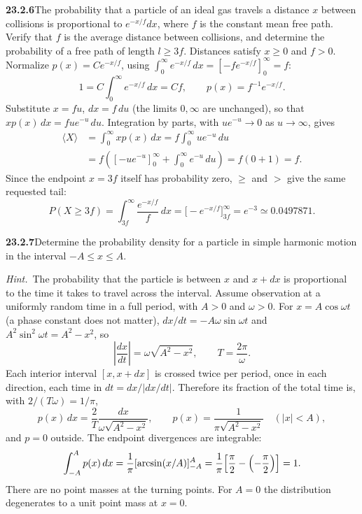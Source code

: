 \par\bigskip
\noindent\textbf{23.2.6}\quad The probability that a particle of
an ideal gas travels a distance $x$ between collisions is
proportional to $e^{-x/f}dx$, where $f$ is the constant mean
free path. Verify that $f$ is the average distance between
collisions, and determine the probability of a free path of
length $l\ge3f$. 
\solution
Distances satisfy $x\ge0$ and $f>0$. Normalize $p(x)=Ce^{-x/f}$, using
$\int_0^\infty e^{-x/f}\,dx=[-fe^{-x/f}]_0^\infty=f$:
\[
1=C\int_0^\infty e^{-x/f}\,dx=Cf,
\qquad p(x)=f^{-1}e^{-x/f}.
\]
Substitute $x=fu$, $dx=f\,du$ (the limits $0,\infty$ are unchanged), so
that $xp(x)\,dx=fue^{-u}\,du$. Integration by parts, with
$ue^{-u}\to0$ as $u\to\infty$, gives
\begin{align*}
\langle X\rangle&=\int_0^\infty xp(x)\,dx=f\int_0^\infty ue^{-u}\,du\\
&=f\left([-ue^{-u}]_0^\infty+\int_0^\infty e^{-u}\,du\right)
=f(0+1)=\boxed f.
\end{align*}
Since the endpoint $x=3f$ itself has probability zero, $\ge$ and $>$
give the same requested tail:
\[
\boxed{P(X\ge3f)=\int_{3f}^\infty\frac{e^{-x/f}}f\,dx
=\bigl[-e^{-x/f}\bigr]_{3f}^\infty
=e^{-3}\simeq0.0497871}.
\]


\par\bigskip
\noindent\textbf{23.2.7}\quad Determine the probability density
for a particle in simple harmonic motion in the interval
$-A\le x\le A$.
\par\emph{Hint.}~The probability that the particle is between
$x$ and $x+dx$ is proportional to the time it takes to travel
across the interval.
\solution
Assume observation at a uniformly random time in a full period, with
$A>0$ and $\omega>0$. For $x=A\cos\omega t$ (a phase constant does not
matter), $dx/dt=-A\omega\sin\omega t$ and
$A^2\sin^2\omega t=A^2-x^2$, so
\[
\left|\frac{dx}{dt}\right|=\omega\sqrt{A^2-x^2},
\qquad T=\frac{2\pi}{\omega}.
\]
Each interior interval $[x,x+dx]$ is crossed twice per period, once in
each direction, each time in $dt=dx/|dx/dt|$. Therefore its fraction
of the total time is, with $2/(T\omega)=1/\pi$,
\[
p(x)\,dx=\frac2T\frac{dx}{\omega\sqrt{A^2-x^2}},
\qquad
\boxed{p(x)=\frac1{\pi\sqrt{A^2-x^2}}\quad(|x|<A)},
\]
and $p=0$ outside. The endpoint divergences are integrable:
\[
\int_{-A}^Ap(x)\,dx=\frac1\pi[\arcsin(x/A)]_{-A}^A
=\frac1\pi\Bigl[\frac\pi2-\Bigl(-\frac\pi2\Bigr)\Bigr]=1.
\]
There are no point masses at the turning points. For $A=0$ the
distribution degenerates to a unit point mass at $x=0$.



